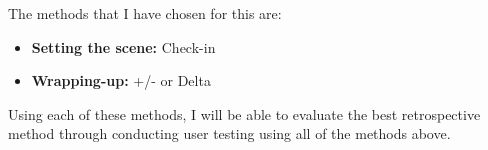 The methods that I have chosen for this are:  \cite{AgileRetrospectivesEstherDerby}
\begin{itemize}
\item \textbf{Setting the scene:} Check-in
\item \textbf{Wrapping-up:} +/- or Delta
\end{itemize}

Using each of these methods, I will be able to evaluate the best retrospective method through conducting user testing using all of the methods above.
